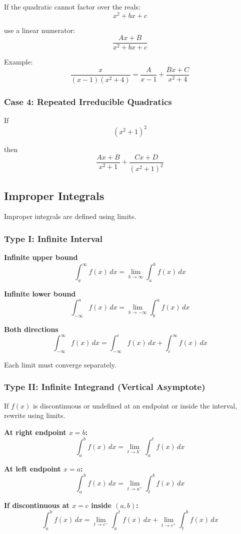 \documentclass[11pt]{article}
\theoremstyle{mydef}
\begin{document}
If the quadratic cannot factor over the reals:
\[
x^2+bx+c
\]

use a linear numerator:
\[
\frac{Ax+B}{x^2+bx+c}
\]

Example:
\[
\frac{x}{(x-1)(x^2+4)}
=
\frac{A}{x-1}
+\frac{Bx+C}{x^2+4}
\]

\subsubsection*{Case 4: Repeated Irreducible Quadratics}

If
\[
(x^2+1)^2
\]

then
\[
\frac{Ax+B}{x^2+1}
+\frac{Cx+D}{(x^2+1)^2}
\]

\subsection*{Improper Integrals}
Improper integrals are defined using limits.


\subsubsection*{Type I: Infinite Interval}

\textbf{Infinite upper bound}
\[
\int_a^{\infty} f(x)\,dx
=\lim_{b\to\infty}\int_a^b f(x)\,dx
\]

\textbf{Infinite lower bound}
\[
\int_{-\infty}^{a} f(x)\,dx
=\lim_{b\to-\infty}\int_b^a f(x)\,dx
\]

\textbf{Both directions}
\[
\int_{-\infty}^{\infty} f(x)\,dx
=
\int_{-\infty}^{c}f(x)\,dx
+
\int_c^{\infty}f(x)\,dx
\]

Each limit must converge separately.

\subsubsection*{Type II: Infinite Integrand (Vertical Asymptote)}

If $f(x)$ is discontinuous or undefined at an endpoint or inside the interval, rewrite using limits.

\textbf{At right endpoint $x=b$:}
\[
\int_a^b f(x)\,dx
=
\lim_{t\to b^-}\int_a^t f(x)\,dx
\]

\textbf{At left endpoint $x=a$:}
\[
\int_a^b f(x)\,dx
=
\lim_{t\to a^+}\int_t^b f(x)\,dx
\]


\textbf{If discontinuous at $x=c$ inside $(a,b)$:}
\[
\int_a^b f(x)\,dx
=
\lim_{t\to c^-}\int_a^t f(x)\,dx
+
\lim_{t\to c^+}\int_t^b f(x)\,dx
\]
\end{document}
